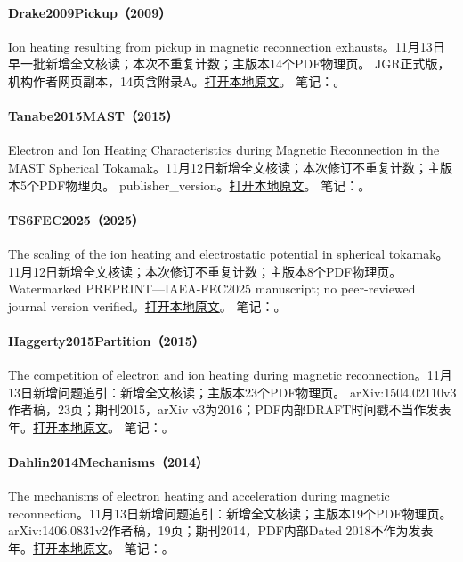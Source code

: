 \paragraph{Drake2009Pickup（2009）}\label{paper:Drake2009Pickup}
Ion heating resulting from pickup in magnetic reconnection exhausts。11月13日早一批新增全文核读；本次不重复计数；主版本14个PDF物理页。
JGR正式版，机构作者网页副本，14页含附录A。\href{run:../../papers/Drake2009Pickup.pdf}{打开本地原文}。
笔记：。\par\smallskip
\paragraph{Tanabe2015MAST（2015）}\label{paper:Tanabe2015MAST}
Electron and Ion Heating Characteristics during Magnetic Reconnection in the MAST Spherical Tokamak。11月12日新增全文核读；本次修订不重复计数；主版本5个PDF物理页。
publisher\_version。\href{run:../../papers/Tanabe2015MAST.pdf}{打开本地原文}。
笔记：。\par\smallskip
\paragraph{TS6FEC2025（2025）}\label{paper:TS6FEC2025}
The scaling of the ion heating and electrostatic potential in spherical tokamak。11月12日新增全文核读；本次修订不重复计数；主版本8个PDF物理页。
Watermarked PREPRINT—IAEA-FEC2025 manuscript; no peer-reviewed journal version verified。\href{run:../../papers/TS6FEC2025.pdf}{打开本地原文}。
笔记：。\par\smallskip
\paragraph{Haggerty2015Partition（2015）}\label{paper:Haggerty2015Partition}
The competition of electron and ion heating during magnetic reconnection。11月13日新增问题追引：新增全文核读；主版本23个PDF物理页。
arXiv:1504.02110v3作者稿，23页；期刊2015，arXiv v3为2016；PDF内部DRAFT时间戳不当作发表年。\href{run:../../papers/Haggerty2015Partition.pdf}{打开本地原文}。
笔记：。\par\smallskip
\paragraph{Dahlin2014Mechanisms（2014）}\label{paper:Dahlin2014Mechanisms}
The mechanisms of electron heating and acceleration during magnetic reconnection。11月13日新增问题追引：新增全文核读；主版本19个PDF物理页。
arXiv:1406.0831v2作者稿，19页；期刊2014，PDF内部Dated 2018不作为发表年。\href{run:../../papers/Dahlin2014Mechanisms.pdf}{打开本地原文}。
笔记：。\par\smallskip
